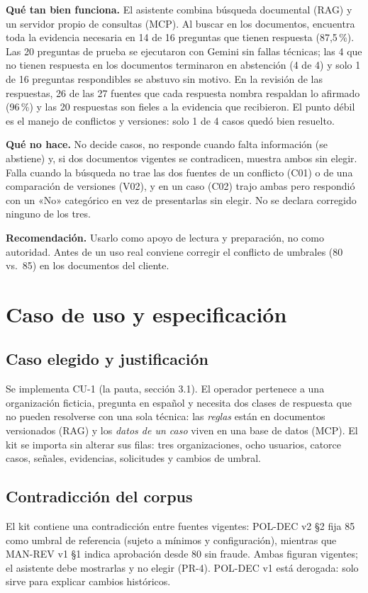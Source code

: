 \documentclass[11pt,a4paper]{article}
\begin{document}
\textbf{Qué tan bien funciona.} El asistente combina búsqueda documental (RAG) y un servidor propio de consultas (MCP). Al buscar en los documentos, encuentra toda la evidencia necesaria en 14 de 16 preguntas que tienen respuesta (87,5\,\%). Las 20 preguntas de prueba se ejecutaron con Gemini sin fallas técnicas; las 4 que no tienen respuesta en los documentos terminaron en abstención (4 de 4) y solo 1 de 16 preguntas respondibles se abstuvo sin motivo. En la revisión de las respuestas, 26 de las 27 fuentes que cada respuesta nombra respaldan lo afirmado (96\,\%) y las 20 respuestas son fieles a la evidencia que recibieron. El punto débil es el manejo de conflictos y versiones: solo 1 de 4 casos quedó bien resuelto.

\textbf{Qué no hace.} No decide casos, no responde cuando falta información (se abstiene) y, si dos documentos vigentes se contradicen, muestra ambos sin elegir. Falla cuando la búsqueda no trae las dos fuentes de un conflicto (C01) o de una comparación de versiones (V02), y en un caso (C02) trajo ambas pero respondió con un «No» categórico en vez de presentarlas sin elegir. No se declara corregido ninguno de los tres.

\textbf{Recomendación.} Usarlo como apoyo de lectura y preparación, no como autoridad. Antes de un uso real conviene corregir el conflicto de umbrales (80 vs.\ 85) en los documentos del cliente.

\section{Caso de uso y especificación}
\subsection{Caso elegido y justificación}
Se implementa CU-1 (la pauta, sección 3.1). El operador pertenece a una organización ficticia, pregunta en español y necesita dos clases de respuesta que no pueden resolverse con una sola técnica: las \emph{reglas} están en documentos versionados (RAG) y los \emph{datos de un caso} viven en una base de datos (MCP). El kit se importa sin alterar sus filas: tres organizaciones, ocho usuarios, catorce casos, señales, evidencias, solicitudes y cambios de umbral.

\subsection{Contradicción del corpus}
El kit contiene una contradicción entre fuentes vigentes: POL-DEC v2 §2 fija 85 como umbral de referencia (sujeto a mínimos y configuración), mientras que MAN-REV v1 §1 indica aprobación desde 80 sin fraude. Ambas figuran vigentes; el asistente debe mostrarlas y no elegir (PR-4). POL-DEC v1 está derogada: solo sirve para explicar cambios históricos.
\end{document}
